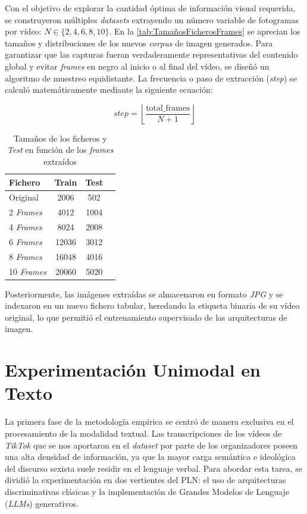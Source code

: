 Con el objetivo de explorar la cantidad óptima de información visual requerida, se construyeron múltiples \textit{datasets} extrayendo un número variable de fotogramas por vídeo: $N \in \{2, 4, 6, 8, 10\}$. En la \autoref{tab:TamañosFicherosFrames} se aprecian los tamaños y distribuciones de los nuevos \textit{corpus} de imagen generados. Para garantizar que las capturas fueran verdaderamente representativas del contenido global y evitar \textit{frames} en negro al inicio o al final del vídeo, se diseñó un algoritmo de muestreo equidistante. La frecuencia o paso de extracción (\textit{step}) se calculó matemáticamente mediante la siguiente ecuación:

\begin{equation}
    step = \left\lfloor \frac{\text{total\_frames}}{N + 1} \right\rfloor
\end{equation}

\begin{table}[H]
    \centering
    \begin{tabular}{lccc}
        \toprule
        \textbf{Fichero} & \textbf{Train} & \textbf{Test}\\
        \midrule
        Original & 2006 & 502 \\
        2 \textit{Frames} & 4012 & 1004 \\
        4 \textit{Frames} & 8024 & 2008 \\
        6 \textit{Frames} & 12036 & 3012 \\
        8 \textit{Frames} & 16048 & 4016 \\
        10 \textit{Frames} & 20060 & 5020 \\

        \bottomrule
    \end{tabular}
    \caption{Tamaños de los ficheros  y \textit{Test} en función de los \textit{frames} extraídos}
    \label{tab:TamañosFicherosFrames}
\end{table}

Posteriormente, las imágenes extraídas se almacenaron en formato \textit{JPG} y se indexaron en un nuevo fichero tabular, heredando la etiqueta binaria de su vídeo original, lo que permitió el entrenamiento supervisado de las arquitecturas de imagen.

\section{Experimentación Unimodal en Texto}
\label{sec:ExperimentacionUnimodalEnTexto}
La primera fase de la metodología empírica se centró de manera exclusiva en el procesamiento de la modalidad textual. Las transcripciones de los vídeos de \textit{TikTok} que se nos aportaron en el \textit{dataset} por parte de los organizadores poseen una alta densidad de información, ya que la mayor carga semántica e ideológica del discurso sexista suele residir en el lenguaje verbal. Para abordar esta tarea, se dividió la experimentación en dos vertientes del PLN: el uso de arquitecturas discriminativas clásicas y la implementación de Grandes Modelos de Lenguaje (\textit{LLMs}) generativos. 

